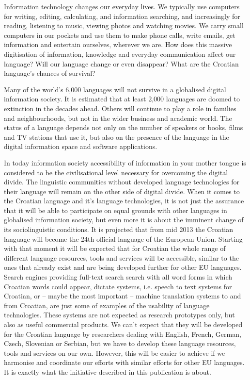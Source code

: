 \begin{multicols}{2}

Information technology changes our everyday lives. We typically use computers for writing, editing, calculating, and information searching, and increasingly for reading, listening to music, viewing photos and watching movies. We carry small computers in our pockets and use them to make phone calls, write emails, get information and entertain ourselves, wherever we are. How does this massive digitisation of information, knowledge and everyday communication affect our language? Will our language change or even disappear? What are the Croatian language’s chances of survival? 

Many of the world’s 6,000 languages will not survive in a globalised digital information society. It is estimated that at least 2,000 languages are doomed to extinction in the decades ahead. Others will continue to play a role in families and neighbourhoods, but not in the wider business and academic world. The status of a language depends not only on the number of speakers or books, films and TV stations that use it, but also on the presence of the language in the digital information space and software applications. 

In today information society accessibility of information in your mother tongue is considered to be the civilisational level necessary for overcoming the digital divide. The linguistic communities without developed language technologies for their language will remain on the other side of digital divide. When it comes to the Croatian language and it's language technologies, it is not just the assurance that it will be able to participate on equal grounds with other languages in globalised information society, but even more it is about the imminent change of its sociolinguistic conditions. It is projected that from mid 2013 the Croatian language will become the 24th official language of the European Union. Starting with that moment it will be expected that for Croatian the whole range of different language resources, tools and services will be accessible, similar to the ones that already exist and are being developed further for other EU languages. Search engines providing full-text search search with all word forms in which Croatian words could appear, dictate systems, i.e. speech to text systems for Croatian, or -- maybe the most important -- machine translation systems to and from Croatian, are just some of examples of the usability of language technologies. These systems are not expected as research prototypes only, but also as useful commercial products. We can't expect that they will be developed for the Croatian language by researchers dealing with English, French, German, Czech, Slovenian or Serbian, but we have to develop these language resources, tools and services on our own. However, this will be easier to achieve if we harmonise and coordinate our efforts with similar efforts for other EU languages. It is exactly what the initiative described in this publication is about.


\end{multicols}
